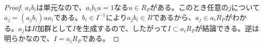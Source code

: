 \begin{proof}
  $a_ib_i$は単元なので、$a_ib_i u = 1$なる$u \in R_P$がある。このとき任意の$j$について$a_j = (a_jb_i) u a_i $である。$b_i \in I^{-1}$により$a_j b_i \in R$であるから、$a_j \in a_i R_P$がわかる。$a_j$は$R$加群として$I$を生成するので、したがって$I \subset a_i R_P$が結論できる。逆は明らかなので、$I = a_i R_P$である。
  \begin{comment}
  すでに、(1)$\To$(2)は示したので、$I$は$R$加群として射影的である。局所環上の射影加群は自由加群である(定理2.5)ことに帰着させる方針で示す。
  $I$は分数イデアルなので、$I$は$R$のあるイデアルと同型であり、はじめから$I \subset R$としてよい。まず、局所化によって射影的という性質は不変であることをみる。
  \lem{
  $R$は環、$S$は$R$の積閉集合で、$P$は射影的$R$加群であるとする。このとき局所化$P_S$は$R_S$上の射影加群である。
  }
\begin{proof}
$R_S$加群$M,N$と$R_S$準同形$\vp \colon M \to N$, $\psi \colon P_S \to N$が与えられ、$\vp$は全射であるとする。$P$は射影的という仮定から、$R_S$加群を$R$加群だと思えば、次の図式
\[
\xymatrix{
{} & P \ar[d] \ar[ddl]_-{f} \\
{} & P_S \ar[d]^-{\psi} \\
M \ar[r]^-{\vp} & N \ar[r] & 0
}
\]
が可換になるような$R$準同形$f$の存在がわかる。全体を$R$加群だとみなし、$R_S$をテンソルする。すると、任意の$R_S$加群$C$について
\[
C \ts_R R_S = C \ts_{R_S} R_S \ts_R R_S = C \ts_{R_S} R_S = C
\]
が成り立つことから、(詳細な議論は省く) 次の可換図式を得る。
\[
\xymatrix{
{} & P_S \ar[d]^-{id} \ar[ddl]_-{f \ts R_S} \\
{} & P_S \ar[d]^-{\psi} \\
M \ar[r]^-{\vp} & N \ar[r] & 0
}
\]
以上により、$P_S$は$R_S$加群として射影的である。
\end{proof}
引用部の証明に戻る。$I$は射影$R$加群なので、$I \ts_R R_P$は射影$R_P$加群である。$R_P$は局所環であるため、$I \ts_R R_P$は自由$R_P$加群であることまでいえる。ここで、局所化の平坦性により$I \ts_R R_P = \Im(I \ts_R R_P \to R \ts_R R_P) = \Im(I \ts_R R_P \to R \ts_R R_P \to R_P) = I R_P = I_P$が保証されていることに気をつける。$I_P \subset R_P$であることから、$I_P$の$R_P$自由加群としての階数は$1$以下であることがすぐにわかる。
$I$は整域$R$の$0$でないイデアルなので、$I$はある$0$でない自由加群を含む。したがって$I_P$の階数は$1$であると決定する。したがって、$I_P \subset R_P$は単項イデアルである。
\end{comment}
\end{proof}


